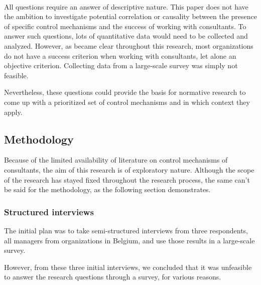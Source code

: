 \documentclass[
  man,floatsintext]{apa6}
\begin{document}
\(~\)

All questions require an answer of descriptive nature. This paper does not have the ambition to investigate potential correlation or causality between the presence of specific control mechanisms and the success of working with consultants. To answer such questions, lots of quantitative data would need to be collected and analyzed. However, as became clear throughout this research, most organizations do not have a success criterion when working with consultants, let alone an objective criterion. Collecting data from a large-scale survey was simply not feasible.

Nevertheless, these questions could provide the basis for normative research to come up with a prioritized set of control mechanisms and in which context they apply.

\subsection{Methodology}\label{methodology}

Because of the limited availability of literature on control mechanisms of consultants, the aim of this research is of exploratory nature. Although the scope of the research has stayed fixed throughout the research process, the same can't be said for the methodology, as the following section demonstrates.

\subsubsection{Structured interviews}\label{structured-interviews}

The initial plan was to take semi-structured interviews from three respondents, all managers from organizations in Belgium, and use those results in a large-scale survey.

However, from these three initial interviews, we concluded that it was unfeasible to answer the research questions through a survey, for various reasons.
\end{document}

